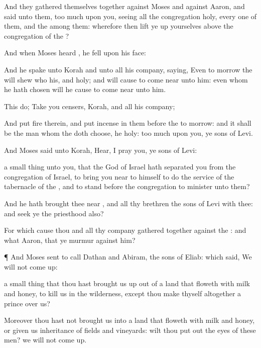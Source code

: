 {And they gathered themselves
together against
Moses and against
Aaron, and
said unto them,
{} too
much upon you, seeing all the
congregation
{}
holy, every one of them, and the
{}
{}
among them: wherefore then lift ye
up yourselves above the
congregation of the
{}?

And when
Moses
heard
{}, he
fell upon his
face:

And he
spake unto
Korah and unto all his
company,
saying, Even to
morrow the
{} will
shew who
{} his, and
{}
holy; and will cause
{} to come
near unto him: even
{} whom he hath
chosen will he cause to come
near unto him.

This
do;
Take you
censers,
Korah, and all his
company;

And
put
fire
therein, and
put
incense in them
before the
{} to
morrow: and it shall be
{} the
man whom the
{} doth
choose, he
{}
holy:
{} too
much upon you, ye
sons of
Levi.

And
Moses
said unto
Korah,
Hear, I pray you, ye
sons of
Levi:

 a small
thing unto you, that the
God of
Israel hath
separated you from the
congregation of
Israel, to bring you
near to himself to
do the
service of the
tabernacle of the
{}, and to
stand
before the
congregation to
minister unto them?

And he hath brought thee
near
{}, and all thy
brethren the
sons of
Levi with thee: and
seek ye the
priesthood also?

For which
cause
{} thou and all thy
company
{} gathered
together against the
{}: and what
{}
Aaron, that ye
murmur against him?


\par }{\PP {}¶ And
Moses
sent to
call
Dathan and
Abiram, the
sons of
Eliab: which
said, We will not come
up:

 a small
thing
that thou hast brought us
up out of a
land that
floweth with
milk and
honey, to
kill us in the
wilderness, except thou
make thyself
altogether a
prince over us?

Moreover thou hast not
brought us into a
land that
floweth with
milk and
honey, or
given us
inheritance of
fields and
vineyards: wilt thou put
out the
eyes of these
men? we will not come
up.

}
